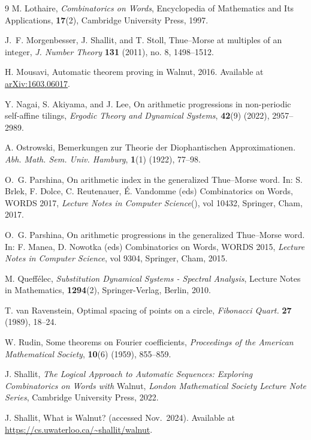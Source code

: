 \documentclass[10pt,a4paper,reqno]{amsart}
\newcommand{\walnut}{{\ttfamily Walnut}}
\begin{document}
\begin{thebibliography}{9}
 M. Lothaire, {\it Combinatorics on Words},  Encyclopedia of Mathematics and Its Applications, {\bf 17}(2), Cambridge University Press, 1997.

J.~F. Morgenbesser, J. Shallit, and T. Stoll, Thue--Morse at multiples of an integer, {\it J. Number Theory} {\bf 131} (2011), no. 8, 1498–1512.

 H. Mousavi, Automatic theorem proving in \walnut{}, 2016. Available at \href{https://arxiv.org/abs/1603.06017.}{arXiv:1603.06017}.

 Y. Nagai, S. Akiyama, and J. Lee, On arithmetic progressions in non-periodic self-affine tilings, {\it Ergodic Theory and Dynamical Systems}, {\bf 42}(9) (2022), 2957--2989.

 A. Ostrowski, Bemerkungen zur Theorie der Diophantischen Approximationen. {\it Abh. Math. Sem. Univ.
Hamburg}, \textbf{1}(1) (1922), 77--98.

O.~G. Parshina, On arithmetic index in the generalized Thue--Morse word. In: S. Brlek, F. Dolce, C. Reutenauer, \'E. Vandomme (eds) Combinatorics on Words, WORDS 2017, {\it Lecture Notes in Computer Science}(), vol 10432, Springer, Cham, 2017. 

O.~G. Parshina, On arithmetic progressions in the generalized Thue--Morse word. In: F. Manea, D. Nowotka (eds) Combinatorics on Words, WORDS 2015, {\it Lecture Notes in Computer Science}, vol 9304, Springer, Cham, 2015.

 M. Queff\'elec, {\it Substitution Dynamical Systems - Spectral Analysis}, Lecture Notes in Mathematics, {\bf 1294}(2), Springer-Verlag, Berlin, 2010.

 T. van Ravenstein, Optimal spacing of points on a circle, {\it Fibonacci Quart.} {\bf 27} (1989), 18--24.

 W. Rudin, Some theorems on Fourier coefficients, {\it Proceedings of the American Mathematical Society}, {\bf 10}(6) (1959), 855--859.

 J. Shallit, {\it The Logical Approach to Automatic Sequences: Exploring Combinatorics on Words with} \walnut{}, {\it London Mathematical Society Lecture Note Series}, Cambridge University Press, 2022.

 J. Shallit, What is Walnut? (accessed Nov.~2024). Available at \url{https://cs.uwaterloo.ca/~shallit/walnut}.


\end{thebibliography}
\end{document}
